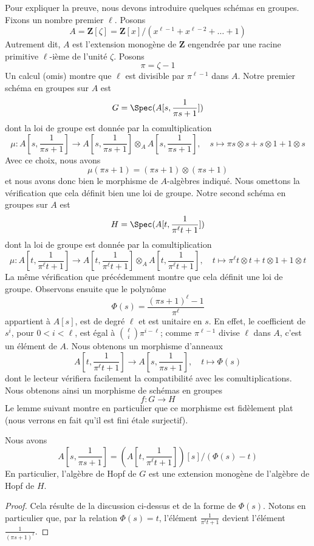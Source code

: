 \noindent
Pour expliquer la preuve, nous devons introduire quelques schémas en groupes.
Fixons un nombre premier $\ell$. Posons
$$
A = \mathbf{Z}[\zeta] =
\mathbf{Z}[x]/(x^{\ell - 1} + x^{\ell - 2} + \ldots + 1)
$$
Autrement dit, $A$ est l'extension monogène de $\mathbf{Z}$ engendrée par
une racine primitive $\ell$-ième de l'unité $\zeta$. Posons
$$
\pi = \zeta - 1
$$
Un calcul (omis) montre que $\ell$ est divisible par $\pi^{\ell - 1}$
dans $A$. Notre premier schéma en groupes sur $A$ est
$$
G = \Spec(A[s, \frac{1}{\pi s + 1}])
$$
dont la loi de groupe est donnée par la comultiplication
$$
\mu :
A[s, \frac{1}{\pi s + 1}]
\longrightarrow
A[s, \frac{1}{\pi s + 1}] \otimes_A A[s, \frac{1}{\pi s + 1}],\quad
s \longmapsto \pi s \otimes s + s \otimes 1 + 1 \otimes s
$$
Avec ce choix, nous avons
$$
\mu(\pi s + 1) = (\pi s + 1) \otimes (\pi s + 1)
$$
et nous avons donc bien le morphisme de $A$-algèbres indiqué. Nous omettons
la vérification que cela définit bien une loi de groupe. Notre second schéma
en groupes sur $A$ est
$$
H = \Spec(A[t, \frac{1}{\pi^\ell t + 1}])
$$
dont la loi de groupe est donnée par la comultiplication
$$
\mu : A[t, \frac{1}{\pi^\ell t + 1}]
\longrightarrow
A[t, \frac{1}{\pi^\ell t + 1}] \otimes_A A[t, \frac{1}{\pi^\ell t + 1}],\quad
t \longmapsto \pi^\ell t \otimes t + t \otimes 1 + 1 \otimes t
$$
La même vérification que précédemment montre que cela définit une loi de groupe.
Observons ensuite que le polynôme
$$
\Phi(s) = \frac{(\pi s + 1)^\ell - 1}{\pi^\ell}
$$
appartient à $A[s]$, est de degré $\ell$ et est unitaire en $s$. En effet, le coefficient
de $s^i$, pour $0 < i < \ell$, est égal à ${\ell \choose i}\pi^{i - \ell}$;
comme $\pi^{\ell - 1}$ divise $\ell$ dans $A$, c'est un élément de $A$.
Nous obtenons un morphisme d'anneaux
$$
A[t, \frac{1}{\pi^\ell t + 1}]
\longrightarrow
A[s, \frac{1}{\pi s + 1}],\quad
t \longmapsto \Phi(s)
$$
dont le lecteur vérifiera facilement la compatibilité avec les comultiplications.
Nous obtenons ainsi un morphisme de schémas en groupes
$$
f : G \to H
$$
Le lemme suivant montre en particulier que ce morphisme est fidèlement
plat (nous verrons en fait qu'il est fini étale surjectif).

\begin{lemma}
\label{lemma-monogenic-one}
Nous avons
$$
A[s, \frac{1}{\pi s + 1}] =
\left(A[t, \frac{1}{\pi^\ell t + 1}]\right)[s]/(\Phi(s) - t)
$$
En particulier, l'algèbre de Hopf de $G$ est une extension monogène
de l'algèbre de Hopf de $H$.
\end{lemma}

\begin{proof}
Cela résulte de la discussion ci-dessus et de la forme de $\Phi(s)$.
Notons en particulier que, par la relation $\Phi(s) = t$, l'élément
$\frac{1}{\pi^\ell t + 1}$ devient l'élément
$\frac{1}{(\pi s + 1)^\ell}$.
\end{proof}

